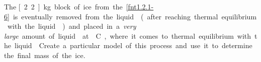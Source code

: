 \label{fnt1.2.1-7}

The \unit[2.2]{kg} block of ice from the \ref{fnt1.2.1-6} is eventually removed from the liquid  (after reaching thermal equilibrium with the liquid ) and placed in a {\em very large} amount of liquid  at \unit[0]{\textdegree C}, where it comes to thermal equilibrium with the liquid . Create a particular model of this process and use it to determine the final mass of the ice.